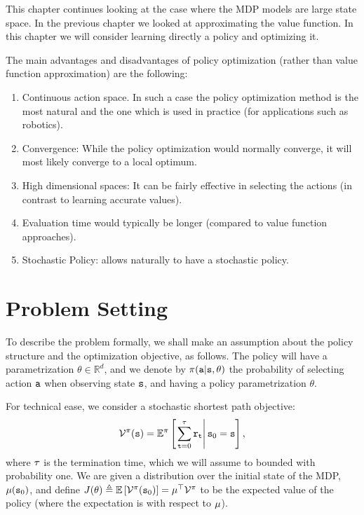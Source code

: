 This chapter continues looking at the case where the MDP models are
large state space. In the previous chapter we looked at
approximating the value function. In this chapter we will consider
learning directly a policy and optimizing it.

 The main advantages and disadvantages of policy optimization (rather
than value function approximation) are the following:
\begin{enumerate}
\item
Continuous action space. In such a case the policy optimization
method is the most natural and the one which is used in practice
(for applications such as robotics).
\item
Convergence: While the policy optimization would normally converge,
it will most likely converge to a local optimum.
\item
High dimensional spaces: It can be fairly effective in selecting the
actions (in contrast to learning accurate values).
\item
Evaluation time would typically be longer (compared to value
function approaches).
\item
Stochastic Policy: allows naturally to have a stochastic policy.
\end{enumerate}

\section{Problem Setting}

To describe the problem formally, we shall make an assumption about the policy structure and the optimization objective, as follows. 
The policy will have a
parametrization $\theta\in \mathbb{R}^{d}$, and we denote by 
$\pi({\tt a}|{\tt s},\theta)$ the probability of
selecting action ${\tt a}$ when observing state ${\tt s}$, and having a policy parametrization
$\theta$. 

For technical ease, we consider a stochastic shortest path objective:
\[\mathcal{V}^\pi({\tt s}) = \mathbb E^{\pi }\left[\left.\sum\limits_{{\tt t} = 0}^\tau {{{\tt r}_{\tt t}}} \right|{\tt s}_0 = {\tt s}\right],\]
where $\tau$ is the termination time, which we will assume to bounded with probability one.
We are given a distribution over the initial state of the MDP, $\mu({\tt s}_0)$, and define $J(\theta) \triangleq \mathbb{E}\left[ \mathcal{V}^\pi({\tt s}_0)\right] = \mu^\top \mathcal{V}^\pi$ to be the expected value of the policy (where the expectation is with respect to $\mu$).

